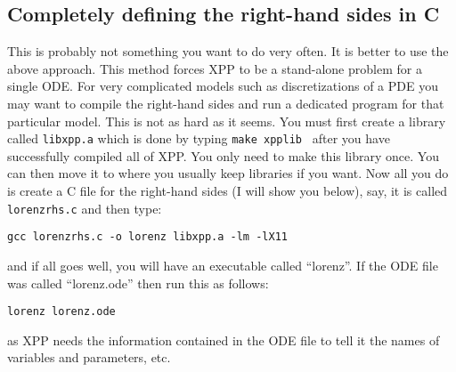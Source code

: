 \documentclass{article}
\begin{document}
\subsection{Completely defining the right-hand sides in C}

This is probably not something you want to do very often. It is better
to use the above approach.  This method forces XPP to be a stand-alone problem for a single ODE.
For very complicated models such as discretizations of a PDE
you may want to compile the right-hand sides and run a dedicated
program for that particular model.  This is not as hard as it
seems. You must first create a library called  {\tt libxpp.a} which is
done by typing  {\tt make xpplib } after you have successfully
compiled all of XPP.  You only need to make this library once. You can
then move it to where you usually keep libraries if you want.  Now all
you do is create a C file for the right-hand sides (I will show you
below), say, it is called {\tt lorenzrhs.c} and then type:
\begin{verbatim}
gcc lorenzrhs.c -o lorenz libxpp.a -lm -lX11
\end{verbatim}
and if all goes well, you will have an executable called ``lorenz''.
If the ODE file was called ``lorenz.ode'' then run this as follows:
\begin{verbatim}
lorenz lorenz.ode
\end{verbatim}
as XPP needs the information contained in the ODE file to tell it the
names of variables and parameters, etc.
\end{document}
